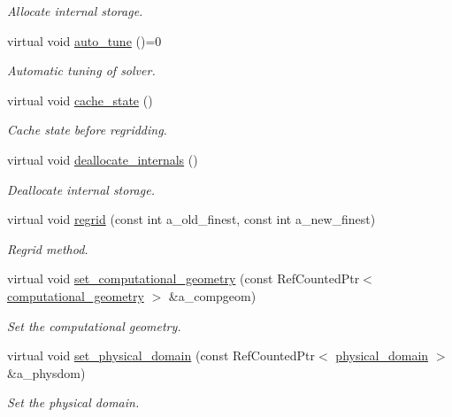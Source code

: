 \begin{DoxyCompactItemize}
\begin{DoxyCompactList}\small\item\em Allocate internal storage. \end{DoxyCompactList}\item 
virtual void \hyperlink{classpoisson__solver_ac6311660788063f000bfea7fe23b6bef}{auto\+\_\+tune} ()=0
\begin{DoxyCompactList}\small\item\em Automatic tuning of solver. \end{DoxyCompactList}\item 
virtual void \hyperlink{classpoisson__solver_ad42c2e08be0926d23441a23c5f28150d}{cache\+\_\+state} ()
\begin{DoxyCompactList}\small\item\em Cache state before regridding. \end{DoxyCompactList}\item 
virtual void \hyperlink{classpoisson__solver_abcc712d1f407dd32fc66eb23fcc0b57f}{deallocate\+\_\+internals} ()
\begin{DoxyCompactList}\small\item\em Deallocate internal storage. \end{DoxyCompactList}\item 
virtual void \hyperlink{classpoisson__solver_a728d3cec398e58c58f1ece01b722eb77}{regrid} (const int a\+\_\+old\+\_\+finest, const int a\+\_\+new\+\_\+finest)
\begin{DoxyCompactList}\small\item\em Regrid method. \end{DoxyCompactList}\item 
virtual void \hyperlink{classpoisson__solver_aacb5fcfe4944724163dc2b4f347311a8}{set\+\_\+computational\+\_\+geometry} (const Ref\+Counted\+Ptr$<$ \hyperlink{classcomputational__geometry}{computational\+\_\+geometry} $>$ \&a\+\_\+compgeom)
\begin{DoxyCompactList}\small\item\em Set the computational geometry. \end{DoxyCompactList}\item 
virtual void \hyperlink{classpoisson__solver_aea3cef534a49d6c0968b699ded457617}{set\+\_\+physical\+\_\+domain} (const Ref\+Counted\+Ptr$<$ \hyperlink{classphysical__domain}{physical\+\_\+domain} $>$ \&a\+\_\+physdom)
\begin{DoxyCompactList}\small\item\em Set the physical domain. \end{DoxyCompactList}\item 

\end{DoxyCompactItemize}
